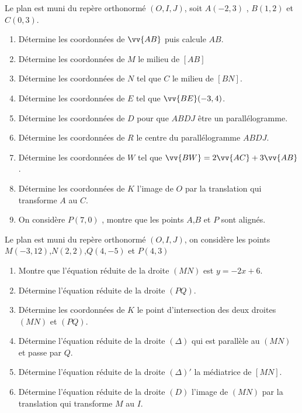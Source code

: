 \documentclass[a4paper,12pt]{article}
\begin{document}
\devoir[prv=true,ds=false,num=5 ,niv=3,sem=2, ,date=18/04/2023,Rdate=24/04/2023]

\begin{exo}
Le plan est muni du repère orthonormé  $(O,I,J)$, soit $A(-2,3)$ , $B(1,2)$ et $C(0,3)$.
\begin{enumerate}
\item Détermine les coordonnées de $\vv{AB}$ puis calcule $AB$.
\item Détermine les coordonnées de $M$ le milieu de $[AB]$
\item Détermine les coordonnées de $N$ tel que $C$ le milieu de $[BN]$.
\item Détermine les coordonnées de $E$ tel que $\vv{BE}(-3,4)$.
\item Détermine les coordonnées de $D$ pour que $ABDJ$ être un parallélogramme.
\item Détermine les coordonnées de $R$ le centre du parallélogramme $ABDJ$.
\item Détermine les coordonnées de $W$ tel que $\vv{BW}=2\vv{AC}+3\vv{AB}$.
\item Détermine les coordonnées de $K$ l'image de $O$ par la translation qui transforme $A$ au $C$.
\item On considère $P(7,0)$ , montre que les points $A$,$B$ et $P$ sont alignés.
\end{enumerate}
\end{exo}

\begin{exo}
Le plan est muni du repère orthonormé  $(O,I,J)$, on considère les points $M(-3,12)$,$N(2,2)$,$Q(4,-5)$ et $P(4,3)$
\begin{enumerate}
\item Montre que l'équation réduite de la droite $(MN)$ est $y=-2x+6$.
\item Détermine l'équation réduite de la droite $(PQ)$.
\item Détermine les coordonnées de $K$ le point d'intersection des deux droites $(MN)$ et $(PQ)$.
\item Détermine l'équation réduite de la droite $(\Delta)$ qui est parallèle au $(MN)$ et passe par $Q$.
\item Détermine l'équation réduite de la droite $(\Delta)'$ la médiatrice de $[MN]$.
\item Détermine l'équation réduite de la droite $(D)$ l'image de $(MN)$ par la translation qui transforme  $M$ au $I$.
\end{enumerate}
\end{exo}
\end{document}
